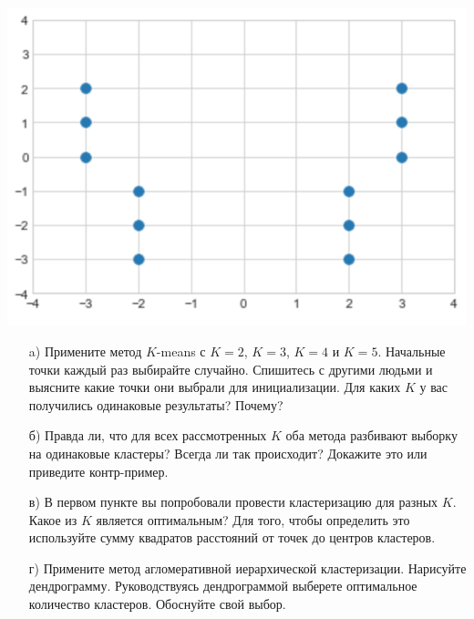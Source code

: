\documentclass[12pt, a4paper, oneside]{article}
\begin{document}
\begin{center}
	\includegraphics[scale=0.3]{knn_3.png}
\end{center}

\begin{enumerate}
	\item[a)] Примените метод $K$-means с $K=2$, $K=3$, $K=4$ и $K=5$. Начальные точки каждый раз выбирайте случайно.  Спишитесь с другими людьми и выясните какие точки они выбрали для инициализации. Для каких $K$ у вас получились одинаковые результаты? Почему?  
	
	\item[б)] Правда ли, что для всех рассмотренных $K$ оба метода разбивают выборку на одинаковые кластеры?  Всегда ли так происходит? Докажите это или приведите контр-пример. 
	
	\item[в)] В первом пункте вы попробовали провести кластеризацию для разных $K$. Какое из $K$ является оптимальным? Для того, чтобы определить это используйте сумму квадратов расстояний от точек до центров кластеров. 
	
	\item[г)] Примените метод агломеративной иерархической кластеризации. Нарисуйте дендрограмму. Руководствуясь дендрограммой выберете оптимальное количество кластеров. Обоснуйте свой выбор.
\end{enumerate}
\end{document}
